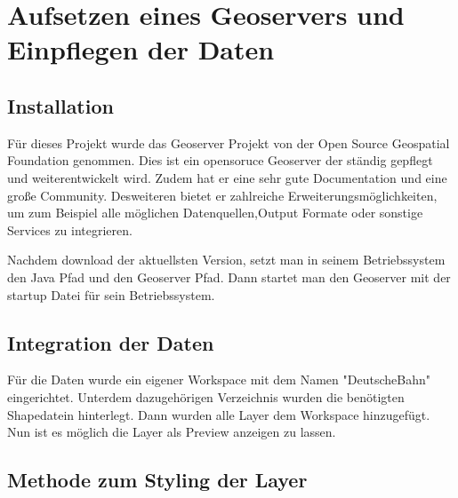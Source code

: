 \section{Aufsetzen eines Geoservers und Einpflegen der Daten}

\subsection{Installation}

Für dieses Projekt wurde das Geoserver Projekt von der Open Source Geospatial Foundation genommen. \cite{geoserver} Dies ist ein opensoruce Geoserver der ständig gepflegt und weiterentwickelt wird. Zudem hat er eine sehr gute Documentation und eine große Community.
Desweiteren bietet er zahlreiche Erweiterungsmöglichkeiten, um zum Beispiel alle möglichen Datenquellen,Output Formate oder sonstige Services zu integrieren.

Nachdem download der aktuellsten Version, setzt man in seinem Betriebssystem den Java Pfad und den Geoserver Pfad. Dann startet man den Geoserver mit der startup Datei für sein Betriebssystem.

\subsection{Integration der Daten}

Für die Daten wurde ein eigener Workspace mit dem Namen "DeutscheBahn" eingerichtet. Unterdem dazugehörigen Verzeichnis wurden die benötigten Shapedatein hinterlegt.
Dann wurden alle Layer dem Workspace hinzugefügt. Nun ist es möglich die Layer als Preview anzeigen zu lassen.
\subsection{Methode zum Styling der Layer}

